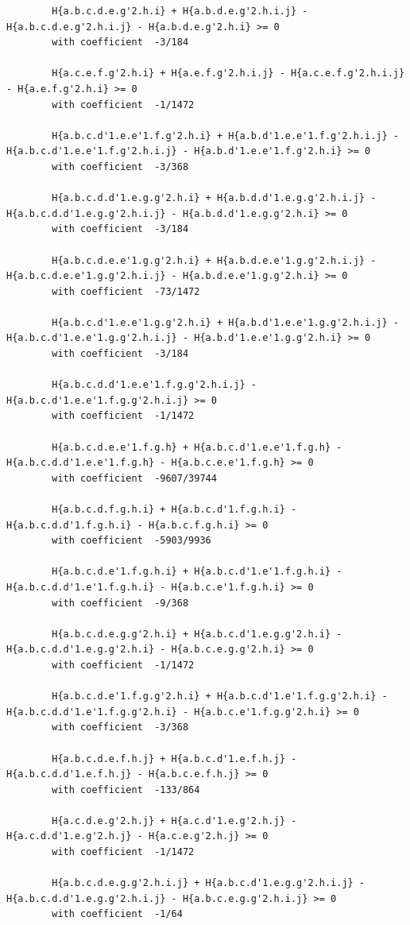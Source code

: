 \documentclass[11pt, a4paper]{kybernetika}
\begin{document}
\begin{verbatim}
		H{a.b.c.d.e.g'2.h.i} + H{a.b.d.e.g'2.h.i.j} - H{a.b.c.d.e.g'2.h.i.j} - H{a.b.d.e.g'2.h.i} >= 0
		with coefficient  -3/184
		
		H{a.c.e.f.g'2.h.i} + H{a.e.f.g'2.h.i.j} - H{a.c.e.f.g'2.h.i.j} - H{a.e.f.g'2.h.i} >= 0
		with coefficient  -1/1472
		
		H{a.b.c.d'1.e.e'1.f.g'2.h.i} + H{a.b.d'1.e.e'1.f.g'2.h.i.j} - H{a.b.c.d'1.e.e'1.f.g'2.h.i.j} - H{a.b.d'1.e.e'1.f.g'2.h.i} >= 0
		with coefficient  -3/368
		
		H{a.b.c.d.d'1.e.g.g'2.h.i} + H{a.b.d.d'1.e.g.g'2.h.i.j} - H{a.b.c.d.d'1.e.g.g'2.h.i.j} - H{a.b.d.d'1.e.g.g'2.h.i} >= 0
		with coefficient  -3/184
		
		H{a.b.c.d.e.e'1.g.g'2.h.i} + H{a.b.d.e.e'1.g.g'2.h.i.j} - H{a.b.c.d.e.e'1.g.g'2.h.i.j} - H{a.b.d.e.e'1.g.g'2.h.i} >= 0
		with coefficient  -73/1472
		
		H{a.b.c.d'1.e.e'1.g.g'2.h.i} + H{a.b.d'1.e.e'1.g.g'2.h.i.j} - H{a.b.c.d'1.e.e'1.g.g'2.h.i.j} - H{a.b.d'1.e.e'1.g.g'2.h.i} >= 0
		with coefficient  -3/184
		
		H{a.b.c.d.d'1.e.e'1.f.g.g'2.h.i.j} - H{a.b.c.d'1.e.e'1.f.g.g'2.h.i.j} >= 0
		with coefficient  -1/1472
		
		H{a.b.c.d.e.e'1.f.g.h} + H{a.b.c.d'1.e.e'1.f.g.h} - H{a.b.c.d.d'1.e.e'1.f.g.h} - H{a.b.c.e.e'1.f.g.h} >= 0
		with coefficient  -9607/39744
		
		H{a.b.c.d.f.g.h.i} + H{a.b.c.d'1.f.g.h.i} - H{a.b.c.d.d'1.f.g.h.i} - H{a.b.c.f.g.h.i} >= 0
		with coefficient  -5903/9936
		
		H{a.b.c.d.e'1.f.g.h.i} + H{a.b.c.d'1.e'1.f.g.h.i} - H{a.b.c.d.d'1.e'1.f.g.h.i} - H{a.b.c.e'1.f.g.h.i} >= 0
		with coefficient  -9/368
		
		H{a.b.c.d.e.g.g'2.h.i} + H{a.b.c.d'1.e.g.g'2.h.i} - H{a.b.c.d.d'1.e.g.g'2.h.i} - H{a.b.c.e.g.g'2.h.i} >= 0
		with coefficient  -1/1472
		
		H{a.b.c.d.e'1.f.g.g'2.h.i} + H{a.b.c.d'1.e'1.f.g.g'2.h.i} - H{a.b.c.d.d'1.e'1.f.g.g'2.h.i} - H{a.b.c.e'1.f.g.g'2.h.i} >= 0
		with coefficient  -3/368
		
		H{a.b.c.d.e.f.h.j} + H{a.b.c.d'1.e.f.h.j} - H{a.b.c.d.d'1.e.f.h.j} - H{a.b.c.e.f.h.j} >= 0
		with coefficient  -133/864
		
		H{a.c.d.e.g'2.h.j} + H{a.c.d'1.e.g'2.h.j} - H{a.c.d.d'1.e.g'2.h.j} - H{a.c.e.g'2.h.j} >= 0
		with coefficient  -1/1472
		
		H{a.b.c.d.e.g.g'2.h.i.j} + H{a.b.c.d'1.e.g.g'2.h.i.j} - H{a.b.c.d.d'1.e.g.g'2.h.i.j} - H{a.b.c.e.g.g'2.h.i.j} >= 0
		with coefficient  -1/64
		

\end{verbatim}
\end{document}
